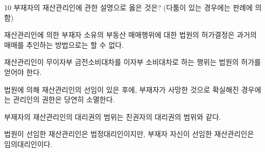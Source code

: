 \begin{question}{10}
부재자의 재산관리인에 관한 설명으로 옳은 것은? (다툼이 있는 경우에는 판례에 의함)
\begin{choices}
  \item 재산관리인에 의한 부재자 소유의 부동산 매매행위에 대한 법원의 허가결정은 과거의 매매를 추인하는 방법으로는 할 수 없다.
  \item 재산관리인이 무이자부 금전소비대차를 이자부 소비대차로 하는 행위는 법원의 허가를 얻어야 한다.
  \item 법원에 의해 재산관리인의 선임이 있은 후에, 부재자가 사망한 것으로 확실해진 경우에는 관리인의 권한은 당연히 소멸한다.
  \item 부재자의 재산관리인의 대리권의 범위는 친권자의 대리권의 범위와 같다.
  \item 법원이 선임한 재산관리인은 법정대리인이지만, 부재자 자신이 선임한 재산관리인은 임의대리인이다.
\end{choices}
\end{question}
